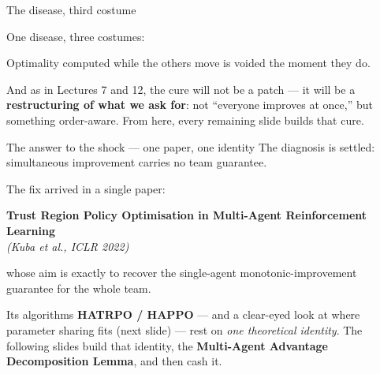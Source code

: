 \documentclass[10pt, aspectratio=169]{beamer}
\newcommand{\paper}[1]{\textcolor{mLightBrown}{\small\textit{(#1)}}}
\begin{document}
\begin{frame}{The disease, third costume}
\begin{center}
\end{center}
\medskip

One disease, three costumes:
\begin{center}\large
\alert{Optimality computed while the others move is voided the moment they do.}
\end{center}
\medskip
\pause
And as in Lectures 7 and 12, the cure will not be a patch --- it will be a \textbf{restructuring of what we ask for}: not ``everyone improves at once,'' but something order-aware. \alert{From here, every remaining slide builds that cure.}
\end{frame}

\begin{frame}{The answer to the shock --- one paper, one identity}
The diagnosis is settled: \alert{simultaneous improvement carries no team guarantee}.
\medskip

\pause
The fix arrived in a single paper:
\begin{center}
\textbf{Trust Region Policy Optimisation in Multi-Agent Reinforcement Learning}\\[2pt]
\paper{Kuba et al., ICLR 2022}
\end{center}
whose aim is exactly to \alert{recover the single-agent monotonic-improvement guarantee for the whole team}.
\medskip

\pause
Its algorithms \textbf{HATRPO / HAPPO} --- and a clear-eyed look at where parameter sharing fits (next slide) --- rest on \emph{one theoretical identity}. The following slides build that identity, the \textbf{Multi-Agent Advantage Decomposition Lemma}, and then cash it.
\end{frame}
\end{document}
